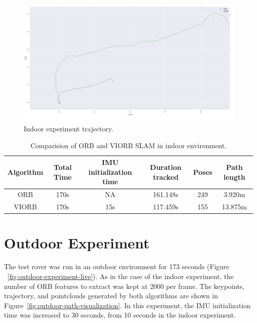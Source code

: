 \begin{figure} [h]
	\centering
	\includegraphics[width=5in]{figures/demo2_trajectory}
	\caption[Indoor experiment trajectory]{\small 
		Indoor experiment trajectory. }
	\label{fig:indoor-experiment-trajectory}
\end{figure}



\begin{table}[h]
	\caption[Comparision of ORB and VIORB SLAM in indoor environment.]{\small Comparision of ORB and VIORB SLAM in indoor environment.}
	\begin{tabular}{|c|c|c|c|c|c|}
		\hline 
		Algorithm & Total Time & IMU initialization time & Duration tracked & Poses & Path length \\ \hline \hline
		ORB & 170s & NA & 161.148s  & 249 & 3.920m  \\ \hline
		VIORB & 170s & 15s & 117.459s & 155 & 13.875m \\ \hline
	\end{tabular}
	\label{tab:indoor-comparision}
\end{table} 




\section {Outdoor Experiment}

The test rover was run in an outdoor environment for 173 seconds (Figure ~\ref{fig:outdoor-experiment-live}). As in the case of the indoor experiment, the number of ORB 
features to extract was kept at 2000 per frame. The keypoints, trajectory, and pointclouds generated by both algorithms are shown in Figure~\ref{fig:outdoor-path-visualization}. In this experiment, the IMU initialization time was increased to 30 seconds, from 10 seconds in the indoor experiment.

